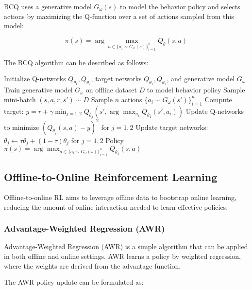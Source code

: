 \documentclass{article}
\begin{document}
BCQ uses a generative model $G_\omega(s)$ to model the behavior policy and selects actions by maximizing the Q-function over a set of actions sampled from this model:

\begin{equation}
\pi(s) = \arg\max_{a \in \{a_i \sim G_\omega(s)\}_{i=1}^n} Q_\theta(s, a)
\end{equation}

The BCQ algorithm can be described as follows:

\begin{algorithm}
\begin{algorithmic}[1]
\STATE Initialize Q-networks $Q_{\theta_1}, Q_{\theta_2}$, target networks $Q_{\bar{\theta}_1}, Q_{\bar{\theta}_2}$, and generative model $G_\omega$
\STATE Train generative model $G_\omega$ on offline dataset $D$ to model behavior policy
    \STATE Sample mini-batch $(s, a, r, s') \sim D$
    \STATE Sample $n$ actions $\{a_i \sim G_\omega(s')\}_{i=1}^n$
    \STATE Compute target: $y = r + \gamma \min_{j=1,2} Q_{\bar{\theta}_j}(s', \arg\max_{a_i} Q_{\bar{\theta}_1}(s', a_i))$
    \STATE Update Q-networks to minimize $(Q_{\theta_j}(s, a) - y)^2$ for $j = 1, 2$
    \STATE Update target networks: $\bar{\theta}_j \leftarrow \tau \theta_j + (1 - \tau) \bar{\theta}_j$ for $j = 1, 2$
\ENDWHILE
\RETURN Policy $\pi(s) = \arg\max_{a \in \{a_i \sim G_\omega(s)\}_{i=1}^n} Q_{\theta_1}(s, a)$
\end{algorithmic}
\end{algorithm}

\subsection{Offline-to-Online Reinforcement Learning}

Offline-to-online RL aims to leverage offline data to bootstrap online learning, reducing the amount of online interaction needed to learn effective policies.

\subsubsection{Advantage-Weighted Regression (AWR)}

Advantage-Weighted Regression (AWR) is a simple algorithm that can be applied in both offline and online settings. AWR learns a policy by weighted regression, where the weights are derived from the advantage function.

The AWR policy update can be formulated as:
\end{document}
